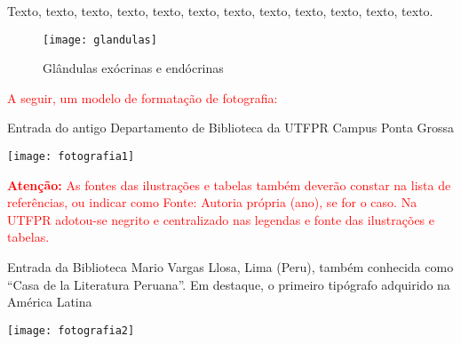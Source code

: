 Texto, texto, texto, texto, texto, texto, texto, texto, texto, texto, texto, texto.


\begin{figure}[!htb]%
     \caption{Glândulas exócrinas e endócrinas}%
     \label{fig:exemplo3}%
     \texttt{[image: glandulas]}%
 \end{figure}


\noindent\textcolor{red}{A seguir, um modelo de formatação de fotografia:}

\newpage

 \begin{photograph}[!htb]%
      \caption{Entrada do antigo Departamento de Biblioteca da UTFPR Campus Ponta Grossa}%
      \label{fig:foto1}%
      \texttt{[image: fotografia1]}%
  \end{photograph}

\noindent\textcolor{red}{\textbf{Atenção:} As fontes das ilustrações e tabelas também deverão constar na lista de referências, ou indicar como Fonte: Autoria própria (ano), se for o caso. Na UTFPR adotou-se negrito e centralizado nas legendas e fonte das ilustrações e tabelas.}

 \begin{photograph}[!htb]%
      \centering
      \caption{Entrada da Biblioteca Mario Vargas Llosa, Lima (Peru), também conhecida como ``Casa de la Literatura Peruana''. Em destaque, o primeiro tipógrafo adquirido na América Latina}%
      \label{fig:foto2}%
      \texttt{[image: fotografia2]}%
  \end{photograph}

